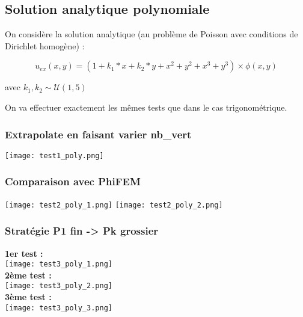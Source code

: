 \subsection{Solution analytique polynomiale}

On considère la solution analytique (au problème de Poisson avec conditions de Dirichlet homogène) :

$$u_{ex}(x,y) = (1+k_1*x+k_2*y+x^2+y^2+x^3+y^3)\times\phi(x,y)$$

avec $k_1,k_2\sim\mathcal{U}(1,5)$

On va effectuer exactement les mêmes tests que dans le cas trigonométrique.

\subsubsection*{Extrapolate en faisant varier nb\_vert}

\begin{minipage}{\linewidth}
	\centering
	\texttt{[image: test1\_poly.png]}
\end{minipage}

\begin{minipage}{0.48\linewidth}
	\centering
	\subsubsection*{Comparaison avec PhiFEM}
	\texttt{[image: test2\_poly\_1.png]}
	\texttt{[image: test2\_poly\_2.png]}
\end{minipage}
\begin{minipage}{0.48\linewidth}

	\centering
	\subsubsection*{Stratégie P1 fin -> Pk grossier}
	\textbf{1er test :} \\
	\texttt{[image: test3\_poly\_1.png]} \\
	\textbf{2ème test :} \\
	\texttt{[image: test3\_poly\_2.png]} \\
	\textbf{3ème test :} \\
	\texttt{[image: test3\_poly\_3.png]} 
\end{minipage}